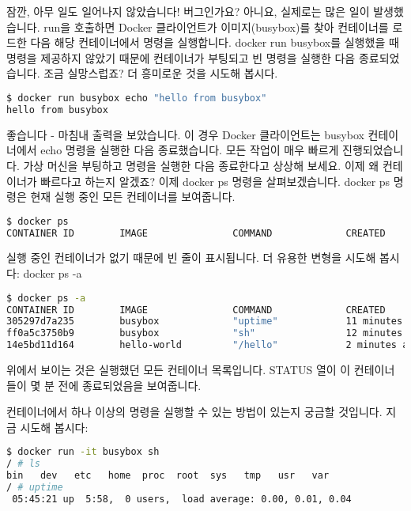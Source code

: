 잠깐, 아무 일도 일어나지 않았습니다! 버그인가요? 아니요, 실제로는 많은 일이 발생했습니다. run을 호출하면 Docker 클라이언트가 이미지(busybox)를 찾아 컨테이너를 로드한 다음 해당 컨테이너에서 명령을 실행합니다. docker run busybox를 실행했을 때 명령을 제공하지 않았기 때문에 컨테이너가 부팅되고 빈 명령을 실행한 다음 종료되었습니다. 조금 실망스럽죠? 더 흥미로운 것을 시도해 봅시다.
\begin{lstlisting}[language=bash]
$ docker run busybox echo "hello from busybox"
hello from busybox
\end{lstlisting}

좋습니다 - 마침내 출력을 보았습니다. 이 경우 Docker 클라이언트는 busybox 컨테이너에서 echo 명령을 실행한 다음 종료했습니다. 모든 작업이 매우 빠르게 진행되었습니다. 가상 머신을 부팅하고 명령을 실행한 다음 종료한다고 상상해 보세요. 이제 왜 컨테이너가 빠르다고 하는지 알겠죠? 이제 docker ps 명령을 살펴보겠습니다. docker ps 명령은 현재 실행 중인 모든 컨테이너를 보여줍니다.
\begin{lstlisting}[language=bash]
$ docker ps
CONTAINER ID        IMAGE               COMMAND             CREATED             STATUS              PORTS               NAMES
\end{lstlisting}

실행 중인 컨테이너가 없기 때문에 빈 줄이 표시됩니다. 더 유용한 변형을 시도해 봅시다: docker ps -a
\begin{lstlisting}[language=bash]
$ docker ps -a
CONTAINER ID        IMAGE               COMMAND             CREATED             STATUS                      PORTS               NAMES
305297d7a235        busybox             "uptime"            11 minutes ago      Exited (0) 11 minutes ago   distracted_goldstine
ff0a5c3750b9        busybox             "sh"                12 minutes ago      Exited (0) 12 minutes ago   elated_ramanujan
14e5bd11d164        hello-world         "/hello"            2 minutes ago       Exited (0) 2 minutes ago    thirsty_euclid
\end{lstlisting}

위에서 보이는 것은 실행했던 모든 컨테이너 목록입니다. STATUS 열이 이 컨테이너들이 몇 분 전에 종료되었음을 보여줍니다.

컨테이너에서 하나 이상의 명령을 실행할 수 있는 방법이 있는지 궁금할 것입니다. 지금 시도해 봅시다:
\begin{lstlisting}[language=bash]
$ docker run -it busybox sh
/ # ls
bin   dev   etc   home  proc  root  sys   tmp   usr   var
/ # uptime
 05:45:21 up  5:58,  0 users,  load average: 0.00, 0.01, 0.04
\end{lstlisting}

